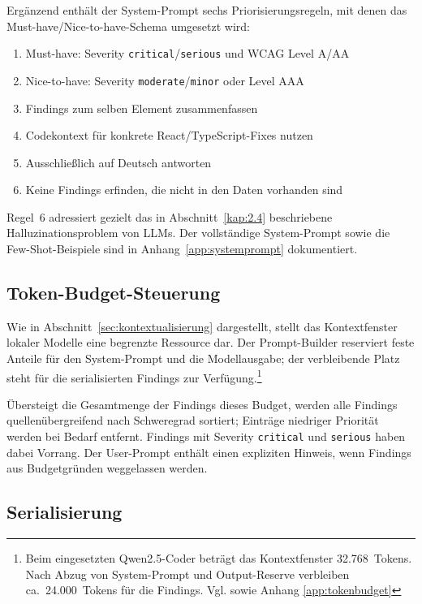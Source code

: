 Ergänzend enthält der System-Prompt sechs Priorisierungsregeln, mit denen das Must-have/Nice-to-have-Schema umgesetzt wird:

\begin{enumerate}
  \item Must-have: Severity \texttt{critical}/\texttt{serious} und \ac{WCAG} Level A/AA
  \item Nice-to-have: Severity \texttt{moderate}/\texttt{minor} oder Level AAA
  \item Findings zum selben Element zusammenfassen
  \item Codekontext für konkrete React/TypeScript-Fixes nutzen
  \item Ausschließlich auf Deutsch antworten
  \item Keine Findings erfinden, die nicht in den Daten vorhanden sind
\end{enumerate}

Regel~6 adressiert gezielt das in Abschnitt~\ref{kap:2.4} beschriebene Halluzinationsproblem von \ac{LLM}s. Der vollständige System-Prompt sowie die Few-Shot-Beispiele sind in Anhang~\ref{app:systemprompt} dokumentiert.

\subsection{Token-Budget-Steuerung}

Wie in Abschnitt~\ref{sec:kontextualisierung} dargestellt, stellt das Kontextfenster lokaler Modelle eine begrenzte \mbox{Ressource} dar. Der Prompt-Builder reserviert feste Anteile für den System-Prompt und die Modellausgabe; der verbleibende Platz steht für die serialisierten Findings zur Verfügung.\footnote{Beim eingesetzten Qwen2.5-Coder beträgt das Kontextfenster 32.768~Tokens. Nach Abzug von System-Prompt und Output-Reserve verbleiben ca.~24.000~Tokens für die Findings. Vgl. \cite{hui2024qwen25coder} sowie Anhang \ref{app:tokenbudget}}

Übersteigt die Gesamtmenge der Findings dieses Budget, werden alle Findings quellenübergreifend nach Schweregrad sortiert; Einträge niedriger Priorität werden bei Bedarf entfernt. Findings mit Severity \texttt{critical} und \texttt{serious} haben dabei Vorrang. Der User-Prompt enthält einen expliziten Hinweis, wenn Findings aus Budgetgründen weggelassen werden.

\subsection{Serialisierung}

